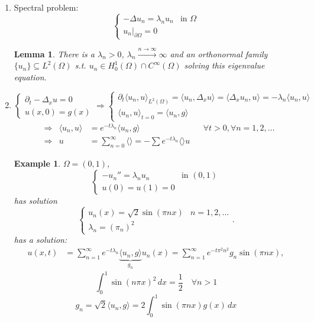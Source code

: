 \documentclass{report}
\theoremstyle{tommy}
\newtheorem{lem}[defn]{Lemma}
\newtheorem{eg}[defn]{Example}
\begin{document}
\begin{enumerate}[label=Step \arabic*:]
  \item Spectral problem:\[\begin{cases}
    -\Delta u_n = \lambda_n u_n &\text{in } \Omega \\ u_n|_{\partial \Omega} = 0
  \end{cases}\]
  \begin{lem}
    There is a \(\lambda_n > 0\), \(\lambda_n \xrightarrow{n \to \infty} \infty\) and an orthonormal family \(\{u_n\} \subseteq L^2(\Omega)\) s.t. \(u_n \in H_0^1(\Omega) \cap C^\infty(\Omega)\) solving this eigenvalue equation.
  \end{lem}
  \item \[\begin{cases}
    \partial_t - \Delta_x u = 0 \\ u(x,0) = g(x)
  \end{cases}
  \Rightarrow
  \begin{cases}
    \partial_t \langle u_n, u\rangle_{L^2(\Omega)} = \langle u_n, \Delta_x u\rangle = \langle \Delta_x u_n, u\rangle = -\lambda_n \langle u_n, u\rangle \\ \langle u_n, u\rangle_{t = 0} = \langle u_n, g \rangle
  \end{cases}\]
  \begin{align*}
    &\Rightarrow &\langle u_n, u\rangle &= e^{-t \lambda_n} \langle u_n, g\rangle &&\forall t > 0, \forall n = 1,2, \dots \\
    &\Rightarrow & u&= \sum_{n=0}^\infty \langle \rangle = - \sum e^{-t \lambda_n} \langle \rangle u
  \end{align*}
    
  \begin{eg}
    \(\Omega = (0,1)\), \[\begin{cases}
      - u_n'' = \lambda_n u_n &\text{in } (0,1) \\ u(0) = u(1) = 0
    \end{cases}\]
    has solution
    \[
      \begin{cases}
        u_n(x) = \sqrt{2}\sin(\pi n x)& n = 1,2, \dots \\ \lambda_n = (\pi_n)^2
      \end{cases}.
    \]
    has a solution:
    \begin{align*}
      u(x,t) &= \sum_{n=1}^\infty e^{-t\lambda_n} \underbrace{\langle u_n, g \rangle}_{g_n} u_n(x) = \sum_{n=1}^\infty e^{- t \pi^2 n^2} g_n \sin(\pi n x),
    \end{align*}
    \[\int_0^1 \sin(n \pi x)^2 \,dx = \frac{1}{2} \quad \forall n > 1\]
    \[g_n = \sqrt{2} \langle u_n, g\rangle = 2 \int_0^1 \sin(\pi n x) g(x)\, dx\]
  \end{eg}
\end{enumerate}
\end{document}
